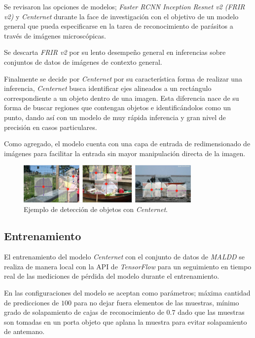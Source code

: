 \documentclass[letter,12pt]{report}
\begin{document}
Se revisaron las opciones de modelos; \textit{Faster RCNN Inception Resnet v2 (FRIR v2)} y
\textit{Centernet} durante la face de investigación con el objetivo de un modelo general que
pueda especificarse en la tarea de reconocimiento de parásitos a través de imágenes
microscópicas.

Se descarta \textit{FRIR v2} por su lento desempeño general en inferencias sobre conjuntos
de datos de imágenes de contexto general.

Finalmente se decide por \textit{Centernet} por su característica forma de realizar una
inferencia, \textit{Centernet} busca identificar ejes alineados a un rectángulo
correspondiente a un objeto dentro de una imagen. Esta diferencia nace de su forma de 
buscar regiones que contengan objetos e identificándolos como un punto, dando así con un
modelo de muy rápida inferencia y gran nivel de precisión en casos particulares.

Como agregado, el modelo cuenta con una capa de entrada de redimensionado de imágenes para
facilitar la entrada sin mayor manipulación directa de la imagen.

\begin{figure}[ht]
    \centering
    \includegraphics[width=0.8\textwidth]{centernet}
    \caption{Ejemplo de detección de objetos con \textit{Centernet}.}
    \label{fig:centernet}
\end{figure}

\subsection{Entrenamiento}
El entrenamiento del modelo \textit{Centernet} con el conjunto de datos de \textit{MALDD} se
realiza de manera local con la API de \textit{TensorFlow} para un seguimiento en tiempo real
de las mediciones de pérdida del modelo durante el entrenamiento.

En las configuraciones del modelo se aceptan como parámetros; máxima cantidad de predicciones
de $100$ para no dejar fuera elementos de las muestras, mínimo grado de solapamiento de cajas
de reconocimiento de $0.7$ dado que las muestras son tomadas en un porta objeto que aplana
la muestra para evitar solapamiento de antemano.
\end{document}
